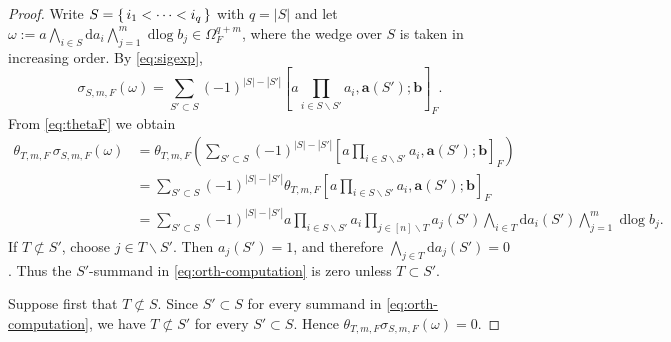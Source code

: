 \documentclass[a4paper,12pt,reqno]{amsart}
\numberwithin{equation}{section}
\theoremstyle{definition}
\DeclareMathOperator{\dlog}{dlog}
\renewcommand{\d}{\mathrm{d}}
\newcommand{\blue}{\color{blue}}
\newcommand{\va}{\mathbf{a}}
\newcommand{\vb}{\mathbf{b}}
\begin{document}
\begin{proof}
Write $S=\set{i_1<\cdots<i_q}$ with $q = |S|$ and 
let $\omega:=a\bigwedge_{i \in S}\d a_i\bigwedge_{j=1}^m\dlog b_j\in \Omega_F^{q+m}$, 
where the wedge over $S$ is taken in increasing order. 
By \eqref{eq:sigexp},
\[
\sigma_{S,m,F}(\omega)
=
\sum_{S' \subset S}(-1)^{|S|-|S'|}
\left[a\prod_{i\in S\smallsetminus S'}a_i,\va(S');\vb\right]_F.
\]
From \eqref{eq:thetaF} we obtain
    \begin{align} \label{eq:orth-computation}
      \theta_{T,m,F}\,\sigma_{S,m,F}(\omega)
      &=\theta_{T,m,F}\left(\sum_{S'\subset S}(-1)^{|S|-|S'|}
      \left[
      a\prod_{i\in S\smallsetminus S'}a_i,
      \va(S');\vb
      \right]_F\right)\\
      &=\sum_{S'\subset S}(-1)^{|S|-|S'|}
      \theta_{T,m,F}\left[
      a\prod_{i\in S\smallsetminus S'}a_i,
      \va(S');\vb
      \right]_F\\
      &= \sum_{S'\subset S}(-1)^{|S|-|S'|}
a\prod_{i\in S\smallsetminus S'}a_i
\prod_{j\in[n]\smallsetminus T}a_j(S')
\bigwedge_{i\in T}\d a_i(S')
\bigwedge_{j=1}^m\dlog b_j.
    \end{align}
If $T\not\subset S'$, choose $j\in T\smallsetminus S'$.  Then
$a_j(S')=1$, and therefore
$\bigwedge_{j\in T}\d a_j(S')
=0$.
Thus the $S'$-summand in \eqref{eq:orth-computation} is zero unless
$T\subset S'$.

Suppose first that $T\not\subset S$.  Since $S'\subset S$ for every
summand in \eqref{eq:orth-computation}, we have $T\not\subset S'$ for
every $S'\subset S$.  Hence
$\theta_{T,m,F}\sigma_{S,m,F}(\omega)=0$.


\end{proof}
\end{document}
